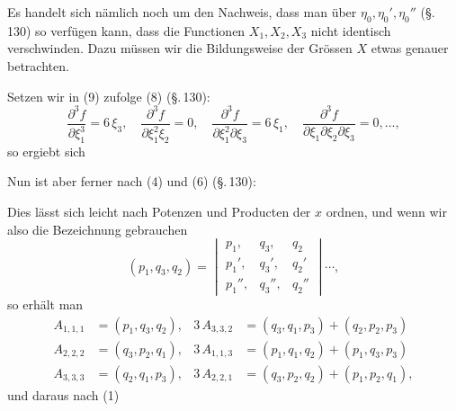 Es handelt sich nämlich noch um den Nachweis, dass man über $\eta_0, \eta_0', \eta_0''$ (§.\,130) so verfügen kann, dass die Functionen $X_1, X_2, X_3$ nicht identisch verschwinden. Dazu müssen wir die Bildungsweise der Grössen $X$ etwas genauer betrachten.

Setzen wir in (9) zufolge (8) (§.\,130):
\[
\frac{\partial^3 f}{\partial \xi_1^3} = 6\,\xi_3, \quad \frac{\partial^3 f}{\partial \xi_1^2 \xi_2} = 0, \quad \frac{\partial^3 f}{\partial \xi_1^2 \partial \xi_3} = 6\,\xi_1, \quad \frac{\partial^3 f}{\partial \xi_1 \partial \xi_2 \partial \xi_3} = 0, \dots, %
\]
so ergiebt sich


Nun ist aber ferner nach (4) und (6) (§.\,130):


Dies lässt sich leicht nach Potenzen und Producten der $x$ ordnen, und wenn wir also die Bezeichnung gebrauchen
\[
(p_1, q_3, q_2) =
\begin{vmatrix}
p_1, & q_3, & q_2 \\
p_1', & q_3', & q_2' \\
p_1'', & q_3'', & q_2''
\end{vmatrix} \cdots,
\]
so erhält man
\[
\begin{aligned}
A_{1,1,1} &= (p_1, q_3, q_2), & 3\,A_{3,3,2} &= (q_3, q_1, p_3) + (q_2, p_2, p_3) \\
A_{2,2,2} &= (q_3, p_2, q_1), & 3\,A_{1,1,3} &= (p_1, q_1, q_2) + (p_1, q_3, p_3) \\
A_{3,3,3} &= (q_2, q_1, p_3), & 3\,A_{2,2,1} &= (q_3, p_2, q_2) + (p_1, p_2, q_1),
\end{aligned}
\]
und daraus nach (1)

